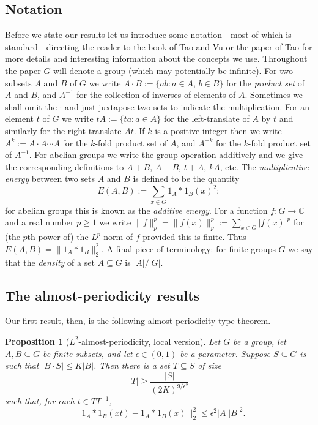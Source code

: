\documentclass[12pt,a4paper,reqno]{amsart}
\numberwithin{equation}{section}
\theoremstyle{plain}
\newtheorem{proposition}[theorem]{Proposition}
\theoremstyle{definition}
\renewcommand{\leq}{\leqslant}
\renewcommand{\geq}{\geqslant}
\renewcommand{\subset}{\subseteq}
\def\C{\mathbb{C}}
\providecommand{\norm}[1]{\lVert#1\rVert}
\begin{document}
\subsection{Notation}
Before we state our results let us introduce some notation---most of which is standard---directing the reader to the book \cite{tao-vu} of Tao and Vu or the paper \cite{tao:non-comm} of Tao for more details and interesting information about the concepts we use. Throughout the paper $G$ will denote a group (which may potentially be infinite). For two subsets $A$ and $B$ of $G$ we write $A \cdot B := \{ ab : \text{$a \in A$, $b \in B$} \}$ for the \emph{product set} of $A$ and $B$, and $A^{-1}$ for the collection of inverses of elements of $A$. Sometimes we shall omit the $\cdot$ and just juxtapose two sets to indicate the multiplication. For an element $t$ of $G$ we write $tA := \{ ta : a \in A \}$ for the left-translate of $A$ by $t$ and similarly for the right-translate $At$. If $k$ is a positive integer then we write $A^k := A \cdot A\cdots A$ for the $k$-fold product set of $A$, and $A^{-k}$ for the $k$-fold product set of $A^{-1}$.
For abelian groups we write the group operation additively and we give the corresponding definitions to $A+B$, $A-B$, $t+A$, $kA$, etc. The \emph{multiplicative energy} between two sets $A$ and $B$ is defined to be the quantity 
\[ E(A,B) := \sum_{x \in G} 1_A*1_B(x)^2; \]
for abelian groups this is known as the \emph{additive energy}.
For a function $f : G \to \C$ and a real number $p \geq 1$ we write $\norm{f}_p^p = \norm{f(x)}_p^p := \sum_{x \in G} |f(x)|^p$ for (the $p$th power of) the $L^p$ norm of $f$ provided this is finite. Thus $E(A,B) = \norm{1_A*1_B}_2^2$. A final piece of terminology: for finite groups $G$ we say that the \emph{density} of a set $A \subset G$ is $|A|/|G|$.

\subsection{The almost-periodicity results}
Our first result, then, is the following almost-periodicity-type theorem.

\begin{proposition}[$L^2$-almost-periodicity, local version]\label{L_2-local}
Let $G$ be a group, let $A, B \subset G$ be finite subsets, and let $\epsilon \in (0,1)$ be a parameter. Suppose $S \subset G$ is such that $|B \cdot S| \leq K|B|$. Then there is a set $T \subset S$ of size 
\[ |T| \geq \frac{|S|}{(2K)^{9/\epsilon^2}} \]
such that, for each $t \in T T^{-1}$,
\[ \norm{ 1_A*1_B(xt) - 1_A*1_B(x) }_2^2 \leq \epsilon^2 |A| |B|^2. \]
\end{proposition} 
\end{document}
